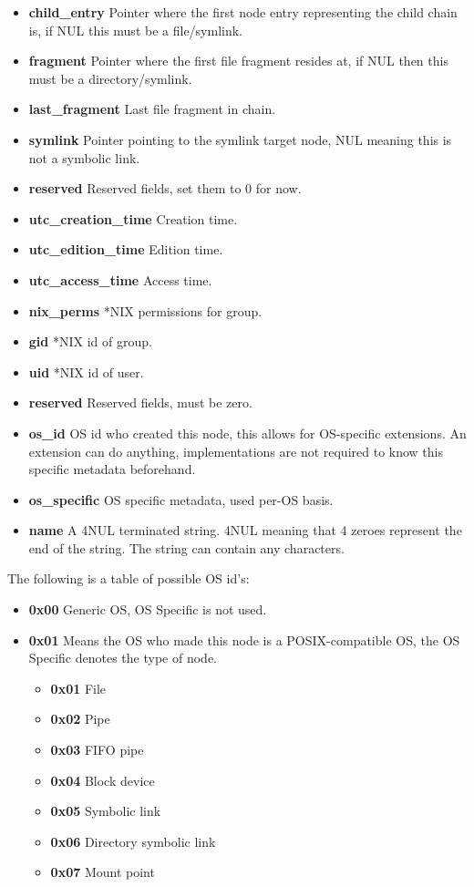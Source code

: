 \documentclass[12pt]{article}
\begin{document}
\begin{itemize}
	\item \textbf{child\_entry} Pointer where the first node entry representing the child chain is, if NUL this must be a file/symlink.
	\item \textbf{fragment} Pointer where the first file fragment resides at, if NUL then this must be a directory/symlink.
	\item \textbf{last_fragment} Last file fragment in chain.
	\item \textbf{symlink} Pointer pointing to the symlink target node, NUL meaning this is not a symbolic link.
	\item \textbf{reserved} Reserved fields, set them to 0 for now.
	\item \textbf{utc\_creation\_time} Creation time.
	\item \textbf{utc\_edition\_time} Edition time.
	\item \textbf{utc\_access\_time} Access time.
	\item \textbf{nix_perms} *NIX permissions for group.
	\item \textbf{gid} *NIX id of group.
	\item \textbf{uid} *NIX id of user.
	\item \textbf{reserved} Reserved fields, must be zero.
	\item \textbf{os\_id} OS id who created this node, this allows for OS-specific extensions. An extension can do anything, implementations are not required to know this specific metadata beforehand.
	\item \textbf{os\_specific} OS specific metadata, used per-OS basis.
	\item \textbf{name} A 4NUL terminated string. 4NUL meaning that 4 zeroes represent the end of the string. The string can contain any characters.
\end{itemize}

The following is a table of possible OS id's:
\begin{itemize}
	\item \textbf{0x00} Generic OS, OS Specific is not used.
	\item \textbf{0x01} Means the OS who made this node is a POSIX-compatible OS, the OS Specific denotes the type of node.
	\begin{itemize}
		\item \textbf{0x01} File
		\item \textbf{0x02} Pipe
		\item \textbf{0x03} FIFO pipe
		\item \textbf{0x04} Block device
		\item \textbf{0x05} Symbolic link
		\item \textbf{0x06} Directory symbolic link
		\item \textbf{0x07} Mount point
	\end{itemize}
\end{itemize}
\end{document}
